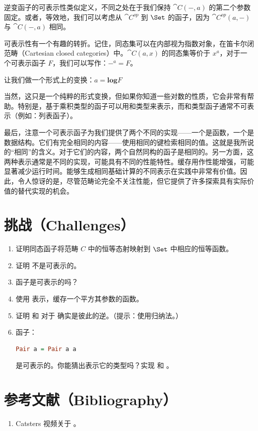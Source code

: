 逆变函子的可表示性类似定义，不同之处在于我们保持 $\cat{C}(-, a)$ 的第二个参数固定。或者，等效地，我们可以考虑从 $\cat{C}^\mathit{op}$ 到 $\Set$ 的函子，因为 $\cat{C}^\mathit{op}(a, -)$ 与 $\cat{C}(-, a)$ 相同。

可表示性有一个有趣的转折。记住，同态集可以在内部视为指数对象，在笛卡尔闭范畴（Cartesian closed categories）中。$\cat{C}(a, x)$ 的同态集等价于 $x^a$，对于一个可表示函子 $F$，我们可以写作：$-^a = F$。

让我们做一个形式上的变换：$a = \mathbf{log}F$

当然，这只是一个纯粹的形式变换，但如果你知道一些对数的性质，它会非常有帮助。特别是，基于乘积类型的函子可以用和类型来表示，而和类型函子通常不可表示（例如：列表函子）。

最后，注意一个可表示函子为我们提供了两个不同的实现——一个是函数，一个是数据结构。它们有完全相同的内容——使用相同的键检索相同的值。这就是我所说的“相同”的含义。对于它们的内容，两个自然同构的函子是相同的。另一方面，这两种表示通常是不同的实现，可能具有不同的性能特性。缓存用作性能增强，可能显著减少运行时间。能够生成相同基础计算的不同表示在实践中非常有价值。因此，令人惊讶的是，尽管范畴论完全不关注性能，但它提供了许多探索具有实际价值的替代实现的机会。

\section{挑战（Challenges）}

\begin{enumerate}
  \tightlist
  \item
  证明同态函子将范畴 $C$ 中的恒等态射映射到 $\Set$ 中相应的恒等函数。
  \item
  证明  不是可表示的。
  \item
   函子是可表示的吗？
  \item
  使用  表示，缓存一个平方其参数的函数。
  \item
  证明  和  对于  确实是彼此的逆。（提示：使用归纳法。）
  \item
  函子：

  \begin{lstlisting}[language=Haskell]
    Pair a = Pair a a
  \end{lstlisting}
  是可表示的。你能猜出表示它的类型吗？实现  和 。
\end{enumerate}

\section{参考文献（Bibliography）}

\begin{enumerate}
  \tightlist
  \item
  Catsters 视频关于
  。
\end{enumerate}
